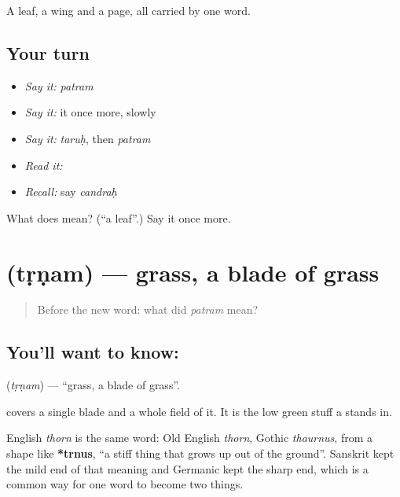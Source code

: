 \begin{grammarlens}[title={What you've built}]
A leaf, a wing and a page, all carried by one word.
\end{grammarlens}

\subsection*{Your turn}
\begin{itemize}
\raggedright
  \item \emph{Say it:} \emph{patram}
  \item \emph{Say it:} it once more, slowly
  \item \emph{Say it:} \emph{taruḥ}, then \emph{patram}
  \item \emph{Read it:} \textbf{}
  \item \emph{Recall:} say \emph{candraḥ}
\end{itemize}

\begin{tcolorbox}[breakable,colback=teal!4,colframe=teal!35!black,title={Before you move on}]
What does  mean? (\textquotedblleft{}a leaf\textquotedblright{}.) Say it once more.
\end{tcolorbox}
\section[\texorpdfstring{\sk{तृणम्} (tṛṇam)}{तृणम् (tṛṇam)}]{ (tṛṇam) — grass, a blade of grass}

\label{lesson:SA-C32-grass}



\begin{quote}
Before the new word: what did \emph{patram} mean?
\end{quote}

\subsection*{You'll want to know: }
\textbf{} (\emph{tṛṇam}) — \textquotedblleft{}grass, a blade of grass\textquotedblright{}.

\textbf{} covers a single blade and a whole field of it. It is the low green stuff a \textbf{} stands in.

English \emph{thorn} is the same word: Old English \emph{thorn}, Gothic \emph{thaurnus}, from a shape like \textbf{*trnus}, \textquotedblleft{}a stiff thing that grows up out of the ground\textquotedblright{}. Sanskrit kept the mild end of that meaning and Germanic kept the sharp end, which is a common way for one word to become two things.

